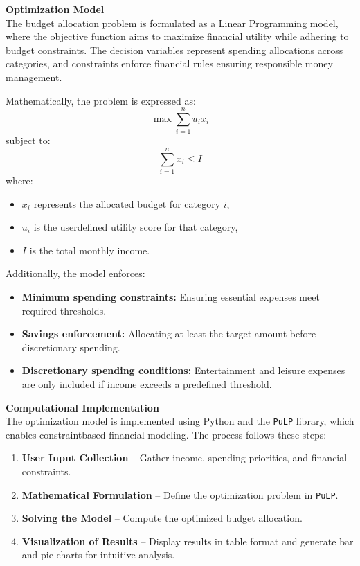 \documentclass{article}
\begin{document}
\textbf{Optimization Model} \\
The budget allocation problem is formulated as a Linear Programming model, where the objective function aims to maximize financial utility while adhering to budget constraints. The decision variables represent spending allocations across categories, and constraints enforce financial rules ensuring responsible money management.

Mathematically, the problem is expressed as:
\[
    \max \sum_{i=1}^{n} u_i x_i
\]
subject to:
\[
    \sum_{i=1}^{n} x_i \leq I
\]
where:
\begin{itemize}
    \item $x_i$ represents the allocated budget for category $i$,
    \item $u_i$ is the userdefined utility score for that category,
    \item $I$ is the total monthly income.
\end{itemize}

Additionally, the model enforces:
\begin{itemize}
    \item \textbf{Minimum spending constraints:} Ensuring essential expenses meet required thresholds.
    \item \textbf{Savings enforcement:} Allocating at least the target amount before discretionary spending.
    \item \textbf{Discretionary spending conditions:} Entertainment and leisure expenses are only included if income exceeds a predefined threshold.
\end{itemize}

\textbf{Computational Implementation} \\
The optimization model is implemented using Python and the \texttt{PuLP} library, which enables constraintbased financial modeling. The process follows these steps:
\begin{enumerate}
    \item \textbf{User Input Collection} – Gather income, spending priorities, and financial constraints.
    \item \textbf{Mathematical Formulation} – Define the optimization problem in \texttt{PuLP}.
    \item \textbf{Solving the Model} – Compute the optimized budget allocation.
    \item \textbf{Visualization of Results} – Display results in table format and generate bar and pie charts for intuitive analysis.
\end{enumerate}
\end{document}
